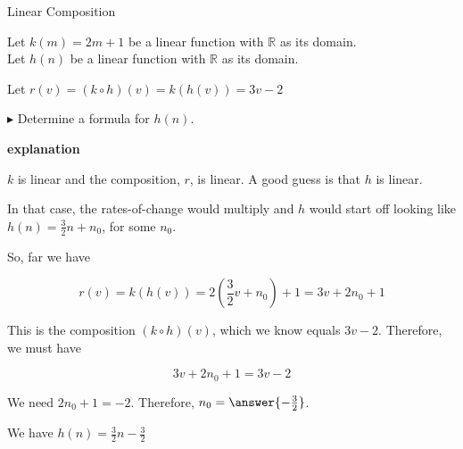 \documentclass{ximera}
\begin{document}
\begin{example} Linear Composition 

Let $k(m) = 2 m + 1$ be a linear function with $\mathbb{R}$ as its domain. \\
Let $h(n)$ be a linear function with $\mathbb{R}$ as its domain. 


Let $r(v) = (k \circ h)(v) = k(h(v)) = 3 v - 2$ 

$\blacktriangleright$ Determine a formula for $h(n)$.





\textbf{\textcolor{red!75!green}{explanation}} 


$k$ is linear and the composition, $r$, is linear. A good guess is that $h$ is linear.  

In that case, the rates-of-change would multiply and $h$ would start off looking like $h(n) = \frac{3}{2} n + n_0$, for some $n_0$.


So, far we have 

\[   r(v) = k(h(v)) = 2 \left(\frac{3}{2} v + n_0\right) + 1  = 3v + 2 n_0 + 1\]




This is the composition $(k \circ h)(v)$, which we know equals $3 v - 2$.  Therefore, we must have 

\[
3 v + 2 n_0 + 1  = 3 v - 2
\]



We need $2 n_0 + 1 = -2$.  Therefore, $n_0 = \answer{-\frac{3}{2}}$.


We have $h(n) = \frac{3}{2} n - \frac{3}{2}$



\end{example}
\end{document}
